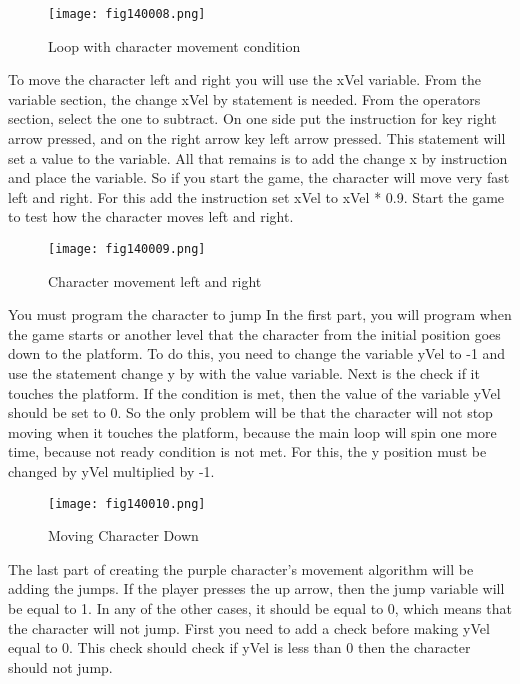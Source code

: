 \begin{figure}[H]
   \centering
   \texttt{[image: fig140008.png]}
   \caption{Loop with character movement condition}
\label{fig140008}
\end{figure}

To move the character left and right you will use the xVel variable. From the variable section, the change xVel by statement is needed. From the operators section, select the one to subtract. On one side put the instruction for key right arrow pressed, and on the right arrow key left arrow pressed. This statement will set a value to the variable. All that remains is to add the change x by instruction and place the variable. So if you start the game, the character will move very fast left and right. For this add the instruction set xVel to xVel * 0.9. Start the game to test how the character moves left and right.

\begin{figure}[H]
   \centering
   \texttt{[image: fig140009.png]}
   \caption{Character movement left and right}
\label{fig140009}
\end{figure}

You must program the character to jump In the first part, you will program when the game starts or another level that the character from the initial position goes down to the platform. To do this, you need to change the variable yVel to -1 and use the statement change y by with the value variable. Next is the check if it touches the platform. If the condition is met, then the value of the variable yVel should be set to 0. So the only problem will be that the character will not stop moving when it touches the platform, because the main loop will spin one more time, because not ready condition is not met. For this, the y position must be changed by yVel multiplied by -1.

\begin{figure}[H]
   \centering
   \texttt{[image: fig140010.png]}
   \caption{Moving Character Down}
\label{fig140010}
\end{figure}

The last part of creating the purple character's movement algorithm will be adding the jumps. If the player presses the up arrow, then the jump variable will be equal to 1. In any of the other cases, it should be equal to 0, which means that the character will not jump. First you need to add a check before making yVel equal to 0. This check should check if yVel is less than 0 then the character should not jump.

